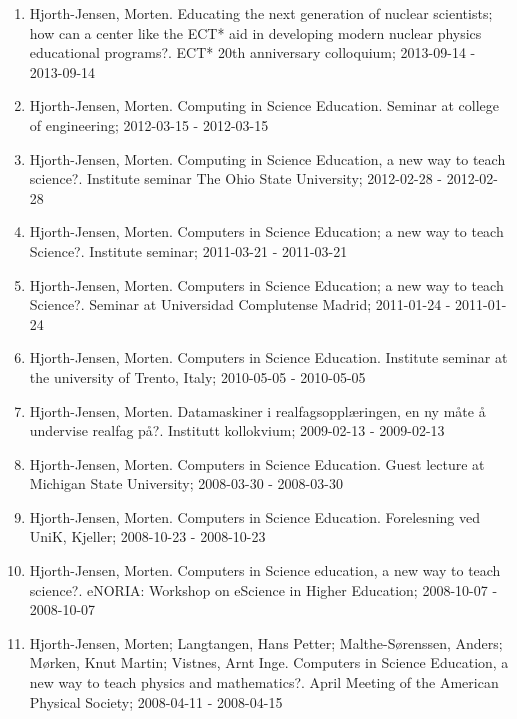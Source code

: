 \documentclass[aps,floatfix,preprint]{revtex4-1}
\begin{document}
\begin{enumerate}
\item Hjorth-Jensen, Morten.  Educating the next generation of nuclear scientists; how can a center like the ECT* aid in developing modern nuclear physics educational programs?. ECT* 20th anniversary colloquium; 2013-09-14 - 2013-09-14

\item Hjorth-Jensen, Morten.  Computing in Science Education. Seminar at college of engineering; 2012-03-15 - 2012-03-15

\item Hjorth-Jensen, Morten.  Computing in Science Education, a new way to teach science?. Institute seminar The Ohio State University; 2012-02-28 - 2012-02-28

\item Hjorth-Jensen, Morten.  Computers in Science Education; a new way to teach Science?. Institute seminar; 2011-03-21 - 2011-03-21

\item Hjorth-Jensen, Morten.  Computers in Science Education; a new way to teach Science?. Seminar at Universidad Complutense Madrid; 2011-01-24 - 2011-01-24

\item Hjorth-Jensen, Morten.  Computers in Science Education. Institute seminar at the university of Trento, Italy; 2010-05-05 - 2010-05-05

\item Hjorth-Jensen, Morten.  Datamaskiner i realfagsopplæringen, en ny måte å undervise realfag på?. Institutt kollokvium; 2009-02-13 - 2009-02-13

\item Hjorth-Jensen, Morten.  Computers in Science Education. Guest lecture at Michigan State University; 2008-03-30 - 2008-03-30

\item Hjorth-Jensen, Morten.  Computers in Science Education. Forelesning ved UniK, Kjeller; 2008-10-23 - 2008-10-23

\item Hjorth-Jensen, Morten.  Computers in Science education, a new way to teach science?. eNORIA: Workshop on eScience in Higher Education; 2008-10-07 - 2008-10-07

\item Hjorth-Jensen, Morten; Langtangen, Hans Petter; Malthe-Sørenssen, Anders; Mørken, Knut Martin; Vistnes, Arnt Inge.  Computers in Science Education, a new way to teach physics and mathematics?. April Meeting of the American Physical Society; 2008-04-11 - 2008-04-15


\end{enumerate}
\end{document}
